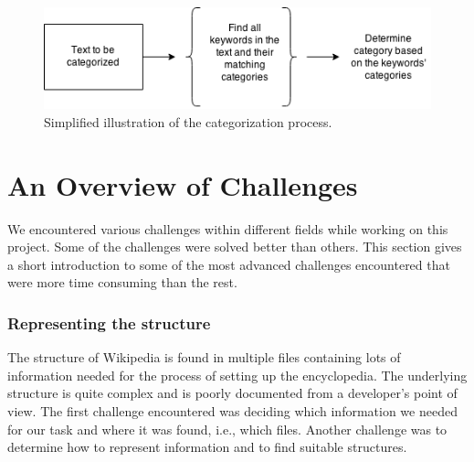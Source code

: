 \begin{figure}[h]
\centering
\includegraphics[width=\textwidth]{Chapters/Introduction/categorizetext}
\caption{Simplified illustration of the categorization process.}
\label{fig:categorizetext}
\end{figure}

\section{An Overview of Challenges}
We encountered various challenges within different fields while working on this project. Some of the challenges were solved better than others. This section gives a short introduction to some of the most advanced challenges encountered that were more time consuming than the rest.

\subsubsection{Representing the structure}
The structure of Wikipedia is found in multiple files containing lots of information needed for the process of setting up the encyclopedia. The underlying structure is quite complex and is poorly documented from a developer's point of view. The first challenge encountered was deciding which information we needed for our task and where it was found, i.e., which files. Another challenge was to determine how to represent  information and to find suitable structures. 



